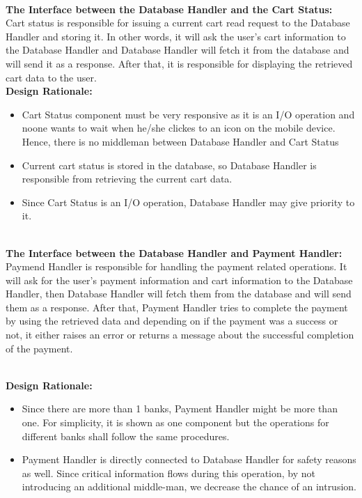 \documentclass[11pt]{article}
\begin{document}
    \textbf{\\The Interface between the Database Handler and the Cart Status:\\}
    Cart status is responsible for issuing a current cart read request to the Database Handler and storing it. In other words, it will ask the user's cart information to the Database Handler and 
    Database Handler will fetch it from the database and will send it as a response. After that, it is responsible for displaying the retrieved cart data to the user. 
    \textbf{\\Design Rationale:}
    \begin{itemize}
       \item Cart Status component must be very responsive as it is an I/O operation and noone wants to wait when he/she clickes to an icon on the mobile device. 
       Hence, there is no middleman between Database Handler and Cart Status
       \item Current cart status is stored in the database, so Database Handler is responsible from retrieving the current cart data. 
       \item Since Cart Status is an I/O operation, Database Handler may give priority to it.
    \end{itemize}
    
    \textbf{\\The Interface between the Database Handler and Payment Handler:\\}
    Paymend Handler is responsible for handling the payment related operations. It will ask for the user's payment information and cart information to the Database Handler,
    then Database Handler will fetch them from the database and will send them as a response. 
    After that, Payment Handler tries to complete the payment by using the retrieved data and depending on if the payment was a success or not, it either raises an error or 
    returns a message about the successful completion of the payment.
    
    \textbf{\\Design Rationale:}
    \begin{itemize}
       \item Since there are more than 1 banks, Payment Handler might be more than one. For simplicity, it is shown as one component but the operations for different banks 
       shall follow the same procedures. 
       \item Payment Handler is directly connected to Database Handler for safety reasons as well. Since critical information flows during this operation, 
       by not introducing an additional middle-man, we decrease the chance of an intrusion. 
    \end{itemize}
\end{document}
